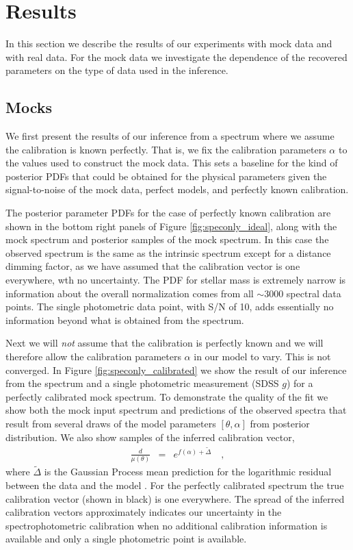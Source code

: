 \documentclass[iop,numberedappendix]{emulateapj}
\begin{document}
\section{Results}

In this section we describe the results of our experiments with mock
data and with real data.  For the mock data we investigate the
dependence of the recovered parameters on the type of data used in the
inference.

\subsection{Mocks}
We first present the results of our inference from a spectrum where we
assume the calibration is known perfectly.  That is, we fix the
calibration parameters $\alpha$ to the values used to construct the
mock data.  This sets a baseline for the kind of posterior PDFs that
could be obtained for the physical parameters given the
signal-to-noise of the mock data, perfect models, and perfectly known
calibration.

The posterior parameter PDFs for the case of perfectly known
calibration are shown in the bottom right panels of Figure
\ref{fig:speconly_ideal}, along with the mock spectrum and posterior
samples of the mock spectrum.  In this case the observed spectrum is
the same as the intrinsic spectrum except for a distance dimming
factor, as we have assumed that the calibration vector is one
everywhere, wth no uncertainty. The PDF for stellar mass is extremely
narrow is information about the overall normalization comes from all
$\sim 3000$ spectral data points.  The single photometric data point,
with S/N of 10, adds essentially no information beyond what is
obtained from the spectrum.

Next we will \emph{not} assume that the calibration is perfectly known
and we will therefore allow the calibration parameters $\alpha$ in our
model to vary.  {\color{red} This is not converged.} In Figure
\ref{fig:speconly_calibrated} we show the result of our inference from
the spectrum and a single photometric measurement (SDSS $g$) for a
perfectly calibrated mock spectrum. To demonstrate the quality of the
fit we show both the mock input spectrum and predictions of the
observed spectra that result from several draws of the model
parameters $[\theta, \alpha]$ from posterior distribution.  We also
show samples of the inferred calibration vector,
\begin{eqnarray} \label{eq:calibration}
\frac{d}{\mu(\theta)} & = & e^{f(\alpha) + \tilde{\Delta}}
\quad ,
\end{eqnarray}
where $\tilde{\Delta}$ is the Gaussian Process mean prediction for the
logarithmic residual between the data and the model \citep{RW}.  For the
perfectly calibrated spectrum the true calibration vector (shown in
black) is one everywhere.  The spread of the inferred calibration
vectors approximately indicates our uncertainty in the spectrophotometric
calibration when no additional calibration information is available
and only a single photometric point is available.
\end{document}
